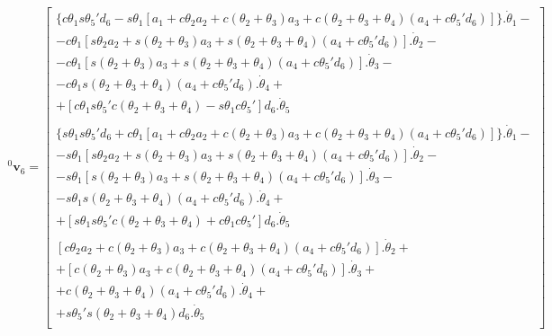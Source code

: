 \begin{equation}
    \label{eq:0v6}
\begin{gathered}
    ^0\textbf{v}_6 = 
    \begin{bmatrix}
        \{c\theta_1s\theta_5'd_6 - s\theta_1[a_1 + c\theta_2a_2 + c(\theta_2 + \theta_3)a_3 + c(\theta_2+\theta_3+\theta_4)(a_4 + c\theta_5'd_6)]\}.\dot{\theta}_1 - \\
        - c\theta_1[s\theta_2a_2 + s(\theta_2 + \theta_3)a_3 + s(\theta_2+\theta_3+\theta_4)(a_4 + c\theta_5'd_6)].\dot{\theta}_2 - \\
        - c\theta_1[s(\theta_2+\theta_3)a_3 + s(\theta_2+\theta_3+\theta_4)(a_4 + c\theta_5'd_6)].\dot{\theta}_3 - \\
        - c\theta_1s(\theta_2+\theta_3+\theta_4)(a_4 + c\theta_5'd_6).\dot{\theta}_4 + \\
        + [c\theta_1s\theta_5'c(\theta_2+\theta_3+\theta_4) - s\theta_1c\theta_5']d_6.\dot{\theta}_5 \\
        \\

        \{s\theta_1s\theta_5'd_6 + c\theta_1[a_1 + c\theta_2a_2 + c(\theta_2+\theta_3)a_3 + c(\theta_2 + \theta_3 + \theta_4)(a_4 + c\theta_5'd_6)]\}.\dot{\theta}_1 - \\
        -s\theta_1[s\theta_2a_2 + s(\theta_2+\theta_3)a_3 + s(\theta_2+\theta_3+\theta_4)(a_4 + c\theta_5'd_6)].\dot{\theta}_2 - \\
        -s\theta_1[s(\theta_2+\theta_3)a_3 + s(\theta_2+\theta_3+\theta_4)(a_4 + c\theta_5'd_6)].\dot{\theta}_3 - \\
        -s\theta_1s(\theta_2+\theta_3+\theta_4)(a_4 + c\theta_5'd_6).\dot{\theta}_4 + \\
        +[s\theta_1s\theta_5'c(\theta_2+\theta_3+\theta_4) + c\theta_1c\theta_5']d_6.\dot{\theta}_5\\
        \\

        [c\theta_2a_2 + c(\theta_2+\theta_3)a_3 + c(\theta_2+\theta_3+\theta_4)(a_4 + c\theta_5'd_6)].\dot{\theta}_2 + \\
        +[c(\theta_2+\theta_3)a_3 + c(\theta_2+\theta_3+\theta_4)(a_4+c\theta_5'd_6)].\dot{\theta}_3 + \\
        +c(\theta_2+\theta_3+\theta_4)(a_4+c\theta_5'd_6).\dot{\theta}_4 + \\
        +s\theta_5's(\theta_2+\theta_3+\theta_4)d_6.\dot{\theta}_5\\
    \end{bmatrix}
\end{gathered}
\end{equation}

